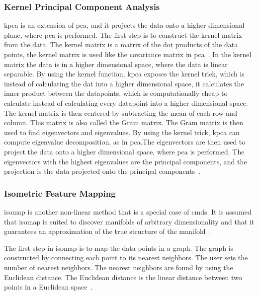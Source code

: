 \subsubsection{Kernel Principal Component Analysis}\label{subsubsec:kernel-principal-component-analysis}
\gls{kpca} is an extension of \gls{pca}, and it projects the data onto a higher dimensional plane, where \gls{pca} is performed. 
The first step is to construct the kernel matrix from the data. The kernel matrix is a matrix of the dot products of the data points, the kernel matrix is used like the covariance matrix in \gls{pca}~\cite{kernel-pca}. In the kernel matrix the data is in a higher dimensional space, where the data is linear separable. By using the kernel function, \gls{kpca} exposes the kernel trick, which is instead of calculating the dat into a higher dimensional space, it calculates the inner product between the datapoints, which is computationally cheap to calculate instead of calculating every datapoint into a higher dimensional space.
The kernel matrix is then centered by subtracting the mean of each row and column. This matrix is also called the Gram matrix. The Gram matrix is then used to find eigenvectors and eigenvalues. By using the kernel trick, \gls{kpca} can compute eigenvalue decomposition, as in \gls{pca}.The eigenvectors are then used to project the data onto a higher dimensional space, where \gls{pca} is performed. The eigenvectors with the highest eigenvalues are the principal components, and the projection is the data projected onto the principal components~\cite{kernel-pca}. 

\subsubsection{Isometric Feature Mapping}\label{subsubsec:isometric-feature-mapping}
\gls{isomap} is another non-linear method that is a special case of \gls{cmds}. It is assumed that \gls{isomap} is suited to discover manifolds of arbitrary dimensionality and that it guarantees an approximation of the true structure of the manifold~\cite{tennenbaum}.

The first step in \gls{isomap} is to map the data points in a graph. The graph is constructed by connecting each point to its nearest neighbors. The user sets the number of nearest neighbors. The nearest neighbors are found by using the Euclidean distance. The Euclidean distance is the linear distance between two points in a Euclidean space~\cite{Multidimensional-Scaling-Sammon-Mapping-and-Isomap}.

